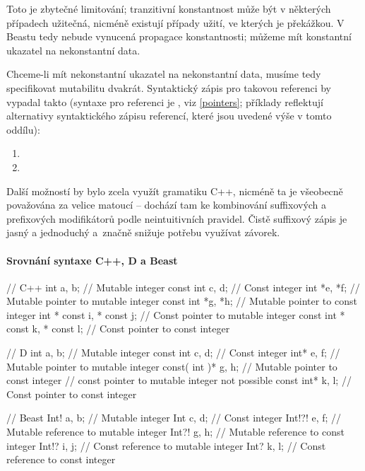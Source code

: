 Toto je zbytečné limitování; tranzitivní konstantnost může být v některých případech užitečná, nicméně existují případy užití, ve kterých je překážkou. V Beastu tedy nebude vynucená propagace konstantnosti; můžeme mít konstantní ukazatel na nekonstantní data.

Chceme-li mít nekonstantní ukazatel na nekonstantní data, musíme tedy specifikovat mutabilitu dvakrát. Syntaktický zápis pro takovou referenci by vypadal takto (syntaxe pro referenci je , viz \ref{pointers}; příklady reflektují alternativy syntaktického zápisu referencí, které jsou uvedené výše v tomto oddílu):
\begin{enumerate}
	\item {}
	\item {}
\end{enumerate}

Další možností by bylo zcela využít gramatiku C++, nicméně ta je všeobecně považována za velice matoucí -- dochází tam ke kombinování suffixových a prefixových modifikátorů podle neintuitivních pravidel. Čistě suffixový zápis je jasný a jednoduchý a~značně snižuje potřebu využívat závorek.

\paragraph{Srovnání syntaxe C++, D a Beast}
\begin{cppcode}
	// C++
	int a, b; // Mutable integer
	const int c, d; // Const integer
	int *e, *f; // Mutable pointer to mutable integer
	const int *g, *h; // Mutable pointer to const integer
	int * const i, * const j; // Const pointer to mutable integer
	const int * const k, * const l; // Const pointer to const integer
\end{cppcode}
\begin{dcode}
	// D
	int a, b; // Mutable integer
	const int c, d; // Const integer
	int* e, f; // Mutable pointer to mutable integer
	const( int )* g, h; // Mutable pointer to const integer
	// const pointer to mutable integer not possible
	const int* k, l; // Const pointer to const integer
\end{dcode}
\begin{code}
	// Beast
	Int! a, b; // Mutable integer
	Int c, d; // Const integer
	Int!?! e, f; // Mutable reference to mutable integer
	Int?! g, h; // Mutable reference to const integer
	Int!? i, j; // Const reference to mutable integer
	Int? k, l; // Const reference to const integer
\end{code}

